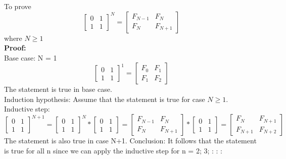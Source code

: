 \documentclass{article}
\begin{document}
\subsubsection{}
To prove
$$
\begin{bmatrix}
    {0} & {1}\\
    {1} & {1} 
\end{bmatrix}^N
=
\begin{bmatrix}
    {F_{N-1}} & {F_N}\\
    {F_N} & {F_{N+1}} 
\end{bmatrix}
$$
where $N\ge 1$\\
\textbf{Proof:}\\
Base case: N = 1\\
$$
\begin{bmatrix}
    {0} & {1}\\
    {1} & {1} 
\end{bmatrix}^1
=
\begin{bmatrix}
    {F_{0}} & {F_1}\\
    {F_1} & {F_{2}} 
\end{bmatrix}
$$
The statement is true in base case.\\
Induction hypothesis: Assume that the statement is true for case $N \ge 1$.\\
Inductive step:
$$
\begin{bmatrix}
    {0} & {1}\\
    {1} & {1} 
\end{bmatrix}^{N+1}
=
\begin{bmatrix}
    {0} & {1}\\
    {1} & {1} 
\end{bmatrix}^{N}
*
\begin{bmatrix}
    {0} & {1}\\
    {1} & {1} 
\end{bmatrix}
=
\begin{bmatrix}
    {F_{N-1}} & {F_N}\\
    {F_N} & {F_{N+1}} 
\end{bmatrix}
*
\begin{bmatrix}
    {0} & {1}\\
    {1} & {1} 
\end{bmatrix}
=
\begin{bmatrix}
    {F_{N}} & {F_{N+1}}\\
    {F_{N+1}} & {F_{N+2}} 
\end{bmatrix}
$$
The statement is also true in case N+1.
Conclusion:
It follows that the statement is true for all n since we can apply the inductive step for n = 2; 3; : : :\\
\end{document}
